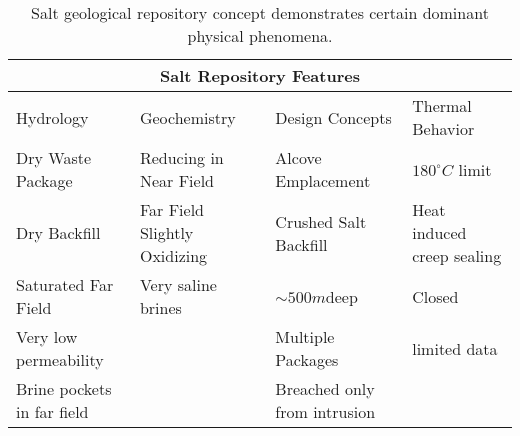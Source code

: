 %
\begin{table}[h!]
  \centering
  \footnotesize{
  \begin{tabularx}{\textwidth}{|l|l|X|X|}
    \multicolumn{4}{c}{\textbf{Salt Repository Features}}\\
    \hline
    Hydrology & Geochemistry & Design Concepts & Thermal Behavior \\ 
    \hline
    Dry Waste Package & Reducing in Near Field & Alcove Emplacement & $180^\circ C$ limit \cite{von_lensa_red-impact_2008} \\
    Dry Backfill &Far Field Slightly Oxidizing &Crushed Salt Backfill & Heat induced creep sealing\\
    Saturated Far Field& Very saline brines  &$\sim500m$deep & Closed \\
    Very low permeability &  & Multiple Packages &limited data\\
    Brine pockets in far field&&Breached only from intrusion&\\
    \hline
  \end{tabularx}
  \caption[Salt repository features.]{Salt geological repository 
  concept demonstrates certain dominant physical phenomena. }
  \label{tab:salt_tab}
  }
\end{table}




